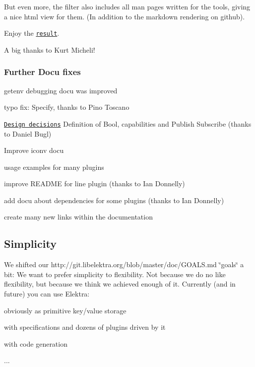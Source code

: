 But even more, the filter also includes all man pages written for the tools, giving a nice html view for them. (In addition to the markdown rendering on github).

Enjoy the \href{http://doc.libelektra.org/api/0.8.14/html/}{\tt result}.

A big thanks to Kurt Micheli!

\subsubsection*{Further Docu fixes}


\begin{DoxyItemize}
\item getenv debugging docu was improved
\item typo fix\+: Specify, thanks to Pino Toscano
\item \href{http://libelektra.org/blob/master/doc/decisions}{\tt Design decisions} Definition of Bool, capabilities and Publish Subscribe (thanks to Daniel Bugl)
\item Improve iconv docu
\item usage examples for many plugins
\item improve R\+E\+A\+D\+M\+E for line plugin (thanks to Ian Donnelly)
\item add docu about dependencies for some plugins (thanks to Ian Donnelly)
\item create many new links within the documentation
\end{DoxyItemize}

\subsection*{Simplicity}

We shifted our http\+://git.libelektra.\+org/blob/master/doc/\+G\+O\+A\+L\+S.md \char`\"{}goals\char`\"{} a bit\+: We want to prefer simplicity to flexibility. Not because we do no like flexibility, but because we think we achieved enough of it. Currently (and in future) you can use Elektra\+:


\begin{DoxyItemize}
\item obviously as primitive key/value storage
\item with specifications and dozens of plugins driven by it
\item with code generation
\item ...
\end{DoxyItemize}

